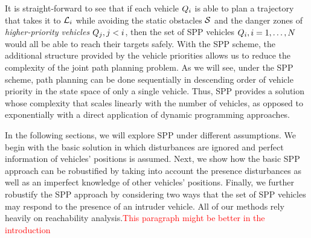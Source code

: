 It is straight-forward to see that if each vehicle $Q_{i}$ is able to plan a trajectory that takes it to $\mathcal{L}_i$ while avoiding the static obstacles $\mathcal{S}$ and the danger zones of \textit{higher-priority vehicles} $Q_{j}, j<i$, then the set of SPP vehicles $Q_{i}, i=1,\ldots,N$ would all be able to reach their targets safely. With the SPP scheme, the additional structure provided by the vehicle priorities allows us to reduce the complexity of the joint path planning problem. As we will see, under the SPP scheme, path planning can be done sequentially in descending order of vehicle priority in the state space of only a single vehicle. Thus, SPP provides a solution whose complexity that scales linearly with the number of vehicles, as opposed to exponentially with a direct application of dynamic programming approaches.

In the following sections, we will explore SPP under different assumptions. We begin with the basic solution in which disturbances are ignored and perfect information of vehicles' positions is assumed. Next, we show how the basic SPP approach can be robustified by taking into account the presence disturbances as well as an imperfect knowledge of other vehicles' positions. Finally, we further robustify the SPP approach by considering two ways that the set of SPP vehicles may respond to the presence of an intruder vehicle. All of our methods rely heavily on reachability analysis.\textcolor{red}{This paragraph might be better in the introduction}